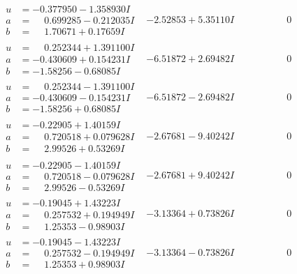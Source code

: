 \documentclass[1p]{elsarticle_modified}
\theoremstyle{definition}
\begin{document}
$$\begin{array}{c|c|c}
\begin{aligned}
u &= -0.377950 - 1.358930 I \\
a &= \phantom{-}0.699285 - 0.212035 I \\
b &= \phantom{-}1.70671 + 0.17659 I\end{aligned}
 & -2.52853 + 5.35110 I & \phantom{-0.000000 } 0 \\ \hline\begin{aligned}
u &= \phantom{-}0.252344 + 1.391100 I \\
a &= -0.430609 + 0.154231 I \\
b &= -1.58256 - 0.68085 I\end{aligned}
 & -6.51872 + 2.69482 I & \phantom{-0.000000 } 0 \\ \hline\begin{aligned}
u &= \phantom{-}0.252344 - 1.391100 I \\
a &= -0.430609 - 0.154231 I \\
b &= -1.58256 + 0.68085 I\end{aligned}
 & -6.51872 - 2.69482 I & \phantom{-0.000000 } 0 \\ \hline\begin{aligned}
u &= -0.22905 + 1.40159 I \\
a &= \phantom{-}0.720518 + 0.079628 I \\
b &= \phantom{-}2.99526 + 0.53269 I\end{aligned}
 & -2.67681 - 9.40242 I & \phantom{-0.000000 } 0 \\ \hline\begin{aligned}
u &= -0.22905 - 1.40159 I \\
a &= \phantom{-}0.720518 - 0.079628 I \\
b &= \phantom{-}2.99526 - 0.53269 I\end{aligned}
 & -2.67681 + 9.40242 I & \phantom{-0.000000 } 0 \\ \hline\begin{aligned}
u &= -0.19045 + 1.43223 I \\
a &= \phantom{-}0.257532 + 0.194949 I \\
b &= \phantom{-}1.25353 - 0.98903 I\end{aligned}
 & -3.13364 + 0.73826 I & \phantom{-0.000000 } 0 \\ \hline\begin{aligned}
u &= -0.19045 - 1.43223 I \\
a &= \phantom{-}0.257532 - 0.194949 I \\
b &= \phantom{-}1.25353 + 0.98903 I\end{aligned}
 & -3.13364 - 0.73826 I & \phantom{-0.000000 } 0 \\ \hline\begin{aligned}

\end{aligned}
\end{array}$$
\end{document}
